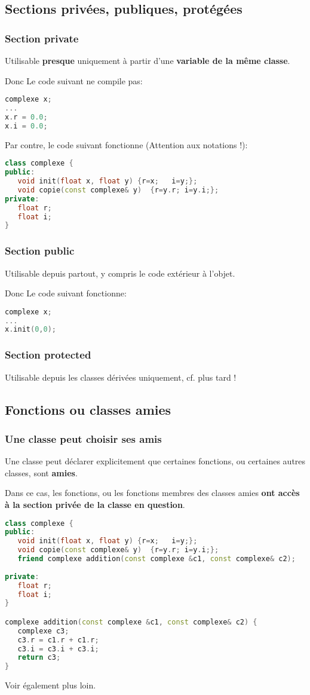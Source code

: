 \documentclass{beamer}
\begin{document}
\subsection{Sections privées, publiques, protégées}

\begin{frame}[fragile=singleslide,shrink=20]
\frametitle {Section private}
Utilisable \textbf{presque} uniquement à partir d'une \textbf{variable de la même classe}.

Donc Le code suivant ne compile pas:
\begin{lstlisting}[language=c++]
complexe x;
...
x.r = 0.0;
x.i = 0.0;
\end{lstlisting}

Par contre, le code suivant fonctionne (Attention aux notations !):
\begin{lstlisting}[language=c++]
class complexe {
public:
   void init(float x, float y) {r=x;   i=y;};
   void copie(const complexe& y)  {r=y.r; i=y.i;};
private:
   float r;
   float i;
}   
\end{lstlisting}
\end{frame}

\begin{frame}[fragile=singleslide,shrink=20]
\frametitle {Section public}
Utilisable depuis partout, y compris le code extérieur à l'objet.

Donc Le code suivant fonctionne:
\begin{lstlisting}[language=c++]
complexe x;
...
x.init(0,0);
\end{lstlisting}
\end{frame}

\begin{frame}[fragile=singleslide,shrink=20]
\frametitle {Section protected}
Utilisable depuis les classes dérivées uniquement, cf. plus tard !
\end{frame}

\subsection{Fonctions ou classes amies}

\begin{frame}[fragile=singleslide,shrink=20]
\frametitle {Une classe peut choisir ses amis}
Une classe peut déclarer explicitement que certaines fonctions, ou certaines autres classes, sont \textbf{amies}.

Dans ce cas, les fonctions, ou les fonctions membres des classes amies \textbf{ont accès à la section privée de la classe en question}.
\begin{lstlisting}[language=c++]
class complexe {
public:
   void init(float x, float y) {r=x;   i=y;};
   void copie(const complexe& y)  {r=y.r; i=y.i;};
   friend complexe addition(const complexe &c1, const complexe& c2);
   
private:
   float r;
   float i;
}  

complexe addition(const complexe &c1, const complexe& c2) {
   complexe c3;
   c3.r = c1.r + c1.r;
   c3.i = c3.i + c3.i;
   return c3;
}
\end{lstlisting}

Voir également plus loin.
\end{frame}
\end{document}
